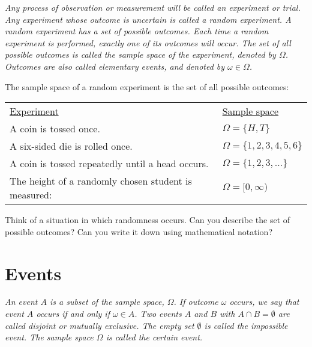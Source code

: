 \begin{definition}
\ben
\it
Any process of observation or measurement will be called an \emph{experiment} or \emph{trial}.
\it
Any experiment whose outcome is uncertain is called a \emph{random experiment}.
\it
A random experiment has a set of possible \emph{outcomes}.
\it
Each time a random experiment is performed, \emph{exactly one} of its outcomes will occur.
\it
The set of all possible outcomes is called the \emph{sample space} of the experiment, denoted by $\Omega$.
\it
Outcomes are also called \emph{elementary events}, and denoted by $\omega\in\Omega$.
\een
\end{definition}

\begin{example}
The sample space of a random experiment is the set of all possible outcomes:
\begin{center}
\begin{tabular}{ll}
\underline{Experiment}									& \underline{Sample space} \\
A coin is tossed once.									& $\Omega = \{H,T\}$ \\
A six-sided die is rolled once.							& $\Omega=\{1,2,3,4,5,6\}$ \\
A coin is tossed repeatedly until a head occurs.		& $\Omega = \{1,2,3,\ldots\}$ \\
The height of a randomly chosen student is measured: 	& $\Omega = [0,\infty)$
\end{tabular}
\end{center}
\end{example}

\begin{exercise}
Think of a situation in which randomness occurs. Can you describe the set of possible outcomes? Can you write it down using mathematical notation?
\end{exercise}

\section{Events}

\begin{definition}
\bit
\it An \emph{event} $A$ is a subset of the sample space, $\Omega$. 
\it If outcome $\omega$ occurs, we say that event $A$ \emph{occurs} if and only if $\omega\in A$.
\it Two events $A$ and $B$ with $A\cap B=\emptyset$ are called \emph{disjoint} or \emph{mutually exclusive}.
\it The empty set $\emptyset$ is called the \emph{impossible event}.
\it The sample space $\Omega$ is called the \emph{certain event}.
\eit
\end{definition}

